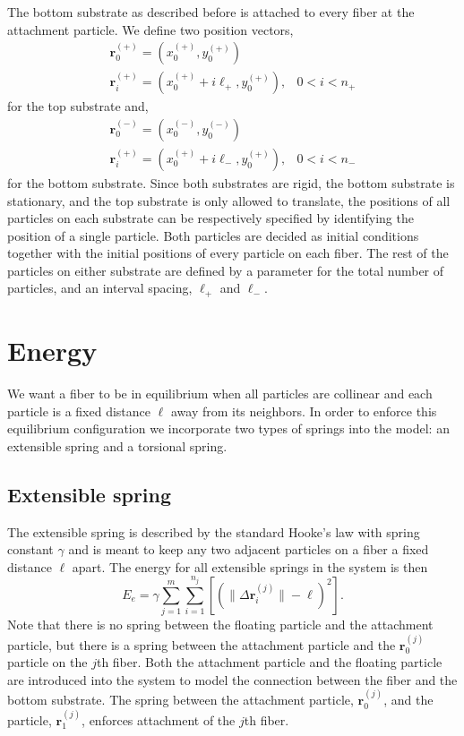 	The bottom substrate as described before is attached to every fiber at the attachment particle. We define two position vectors,
\begin{eqnarray}
	\textbf{r}_0^{(+)} = (x_0^{(+)},y_0^{(+)}) & \\
	\textbf{r}_i^{(+)} = (x_0^{(+)} + i\ell_+,y_0^{(+)}), & 0 < i < n_+
\end{eqnarray}
for the top substrate and,
\begin{eqnarray}
	\textbf{r}_0^{(-)} = (x_0^{(-)},y_0^{(-)}) & \\
	\textbf{r}_i^{(+)} = (x_0^{(+)} + i\ell_-,y_0^{(+)}), & 0 < i < n_-
\end{eqnarray} 
for the bottom substrate. Since both substrates are rigid, the bottom substrate is stationary, and the top substrate is only allowed to translate, the positions of all particles on each substrate can be respectively specified by identifying the position of a single particle. Both particles are decided as initial conditions together with the initial positions of every particle on each fiber. The rest of the particles on either substrate are defined by a parameter for the total number of particles, and an interval spacing, $\ell_+$ and $\ell_-$.

\section{Energy}

	We want a fiber to be in equilibrium when all particles are collinear and each particle is a fixed distance $\ell$ away from its neighbors. In order to enforce this equilibrium configuration we incorporate two types of springs into the model: an extensible spring and a torsional spring.

\subsection{Extensible spring}

	The extensible spring is described by the standard Hooke's law with spring constant $\gamma$ and is meant to keep any two adjacent particles on a fiber a fixed distance $\ell$ apart. The energy for all extensible springs in the system is then
\begin{equation}
	E_e = \gamma \sum_{j=1}^m \sum_{i=1}^{n_j} \left[ \left( \|\Delta \textbf{r}_i^{(j)} \| - \ell \right)^2 \right].
\end{equation}
Note that there is no spring between the floating particle and the attachment particle, but there is a spring between the attachment particle and the $\textbf{r}_0^{(j)}$ particle on the $j$th fiber. Both the attachment particle and the floating particle are introduced into the system to model the connection between the fiber and the bottom substrate. The spring between the attachment particle, $\textbf{r}_0^{(j)}$, and the particle, $\textbf{r}_1^{(j)}$, enforces attachment of the $j$th fiber.

